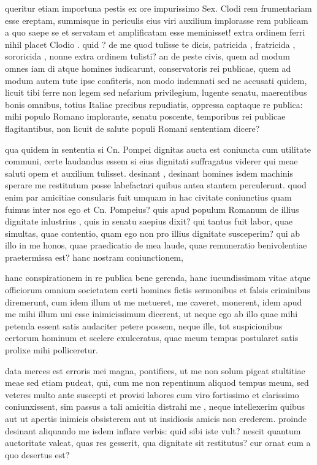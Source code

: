  queritur etiam importuna pestis ex ore impurissimo Sex. Clodi rem frumentariam esse ereptam, summisque in periculis eius viri auxilium implorasse rem publicam a quo saepe se et servatam et amplificatam esse meminisset! extra ordinem ferri nihil placet Clodio . quid ? de me quod tulisse te dicis, patricida , fratricida , sororicida , nonne extra ordinem tulisti? an de peste civis, quem ad modum omnes iam di atque homines iudicarunt, conservatoris rei publicae, quem ad modum autem tute ipse confiteris, non modo indemnati sed ne accusati quidem, licuit tibi ferre non legem sed nefarium privilegium, lugente senatu, maerentibus bonis omnibus, totius Italiae precibus repudiatis, oppressa captaque re publica: mihi populo Romano implorante, senatu poscente, temporibus rei publicae flagitantibus, non licuit de salute populi Romani sententiam dicere?

 qua quidem in sententia si Cn. Pompei dignitas aucta est coniuncta cum utilitate communi, certe laudandus essem si eius dignitati suffragatus viderer qui meae saluti opem et auxilium tulisset. desinant , desinant homines isdem machinis sperare me restitutum posse labefactari quibus antea stantem perculerunt. quod enim par amicitiae consularis fuit umquam in hac civitate coniunctius quam fuimus inter nos ego et Cn. Pompeius? quis apud populum Romanum de illius dignitate inlustrius , quis in senatu saepius dixit? qui tantus fuit labor, quae simultas, quae contentio, quam ego non pro illius dignitate susceperim? qui ab illo in me honos, quae praedicatio de mea laude, quae remuneratio benivolentiae praetermissa est? hanc nostram coniunctionem,

 hanc conspirationem in re publica bene gerenda, hanc iucundissimam vitae atque officiorum omnium societatem certi homines fictis sermonibus et falsis criminibus diremerunt, cum idem illum ut me metueret, me caveret, monerent, idem apud me mihi illum uni esse inimicissimum dicerent, ut neque ego ab illo quae mihi petenda essent satis audaciter petere possem, neque ille, tot suspicionibus certorum hominum et scelere exulceratus, quae meum tempus postularet satis prolixe mihi polliceretur.

 data merces est erroris mei magna, pontifices, ut me non solum pigeat stultitiae meae sed etiam pudeat, qui, cum me non repentinum aliquod tempus meum, sed veteres multo ante suscepti et provisi labores cum viro fortissimo et clarissimo coniunxissent, sim passus a tali amicitia distrahi me , neque intellexerim quibus aut ut apertis inimicis obsisterem aut ut insidiosis amicis non crederem. proinde desinant aliquando me isdem inflare verbis: quid sibi iste vult? nescit quantum auctoritate valeat, quas res gesserit, qua dignitate sit restitutus? cur ornat eum a quo desertus est?

